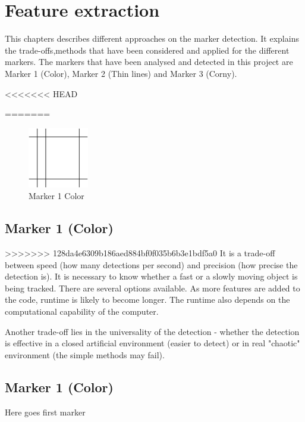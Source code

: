 \chapter{Feature extraction} %
\label{chap:feature_extraction}
This chapters describes different approaches on the marker detection. It explains the trade-offs,methods that have been considered and applied for the different markers. The markers that have been analysed and detected in this project are Marker 1 (Color), Marker 2 (Thin lines) and Marker 3 (Corny). 

<<<<<<< HEAD

=======
\begin{figure}[ht!]
	\centering
	\includegraphics[width=100px]{figures/Marker2a}
	\caption{Marker 1 Color}
	\label{fig:markerColor}
\end{figure}


\section{Marker 1 (Color)} 
>>>>>>> 128da4e6309b186aed884bf0f035b6b3e1bdf5a0
It is a trade-off between speed (how many detections per second) and precision (how precise the detection is). It is necessary to know whether a fast or a slowly moving object is being tracked. There are several options available. As more features are added to the code, runtime is likely to become longer. The runtime also depends on the computational capability of the computer.

Another trade-off lies in the universality of the detection - whether the detection is effective in a closed artificial environment (easier to detect) or in real "chaotic" environment (the simple methods may fail).

\newpage


\section{Marker 1 (Color)} 
Here goes first marker


